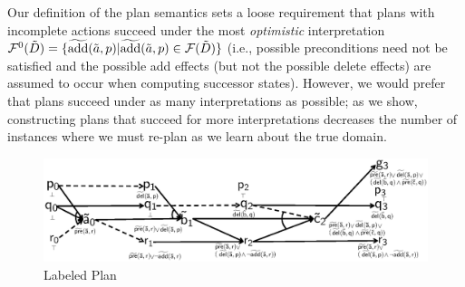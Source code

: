 \documentclass{article}
\begin{document}

  


%
%

Our definition of the plan semantics sets a loose requirement that plans with incomplete actions succeed under the most  {\em optimistic} interpretation ${\cal F}^0(\tilde{D}) = \{ \widetilde{\text{add}}(\tilde{a}, p) | \widetilde{\text{add}}(\tilde{a}, p) \in {\cal F}(\tilde{D})\}$ (i.e., possible preconditions need not be satisfied and the possible add effects (but not the possible delete effects) are assumed to occur when computing successor states).   However, we would prefer that plans succeed under as many interpretations as possible; as we show, constructing plans that succeed for more interpretations decreases the number of instances where we must re-plan as we learn about the true domain.

\begin{figure}[t]
\vspace*{-1cm}
\includegraphics[width=\linewidth]{example.eps}
\vspace*{-1cm}\caption{\label{fig:example} Labeled Plan}
\end{figure}


\end{document}
